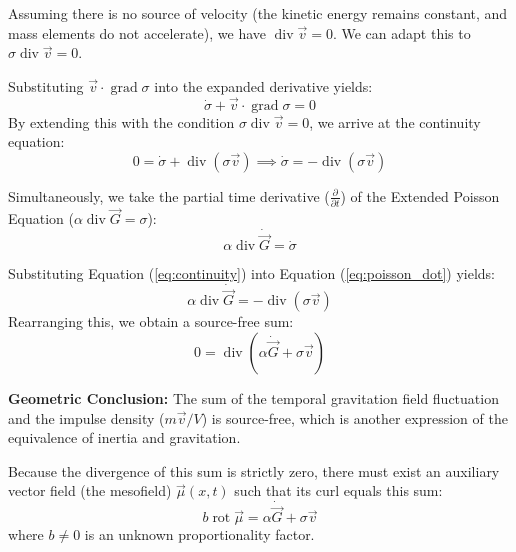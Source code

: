 \documentclass[11pt,a4paper,oneside]{article}
\begin{document}
Assuming there is no source of velocity (the kinetic energy remains constant, and mass elements do not accelerate), we have $\operatorname{div} \vec{v} = 0$. We can adapt this to $\sigma \operatorname{div} \vec{v} = 0$. 

Substituting $\vec{v} \cdot \operatorname{grad} \sigma$ into the expanded derivative yields:
\begin{equation}
    \dot{\sigma} + \vec{v} \cdot \operatorname{grad} \sigma = 0
\end{equation}
By extending this with the condition $\sigma \operatorname{div} \vec{v} = 0$, we arrive at the continuity equation:
\begin{equation}
    0 = \dot{\sigma} + \operatorname{div}(\sigma \vec{v}) \implies \dot{\sigma} = -\operatorname{div}(\sigma \vec{v})
    \label{eq:continuity}
\end{equation}

Simultaneously, we take the partial time derivative ($\frac{\partial}{\partial t}$) of the Extended Poisson Equation ($\alpha \operatorname{div} \vec{G} = \sigma$):
\begin{equation}
    \alpha \operatorname{div} \dot{\vec{G}} = \dot{\sigma}
    \label{eq:poisson_dot}
\end{equation}

Substituting Equation (\ref{eq:continuity}) into Equation (\ref{eq:poisson_dot}) yields:
\begin{equation}
    \alpha \operatorname{div} \dot{\vec{G}} = -\operatorname{div}(\sigma \vec{v})
\end{equation}
Rearranging this, we obtain a source-free sum:
\begin{equation}
    0 = \operatorname{div} (\alpha \dot{\vec{G}} + \sigma \vec{v})
\end{equation}

\textbf{Geometric Conclusion:} The sum of the temporal gravitation field fluctuation and the impulse density ($m\vec{v}/V$) is source-free, which is another expression of the equivalence of inertia and gravitation. 

Because the divergence of this sum is strictly zero, there must exist an auxiliary vector field (the mesofield) $\vec{\mu}(x,t)$ such that its curl equals this sum:
\begin{equation}
    b \operatorname{rot} \vec{\mu} = \alpha \dot{\vec{G}} + \sigma \vec{v}
    \label{eq:mesofield}
\end{equation}
where $b \neq 0$ is an unknown proportionality factor. 
\end{document}

